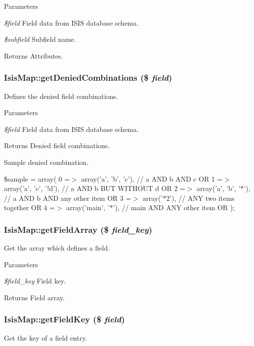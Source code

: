 \begin{DoxyParams}{Parameters}
\item[{\em \$field}]Field data from ISIS database schema.\item[{\em \$subfield}]Subfield name.\end{DoxyParams}
\begin{DoxyReturn}{Returns}
Attributes. 
\end{DoxyReturn}
\hypertarget{classIsisMap_a57808b2ac5892d71308c629b6ae990ff}{
\subsubsection[{getDeniedCombinations}]{\setlength{\rightskip}{0pt plus 5cm}IsisMap::getDeniedCombinations (\$ {\em field})}}
\label{classIsisMap_a57808b2ac5892d71308c629b6ae990ff}
Defines the denied field combinations.


\begin{DoxyParams}{Parameters}
\item[{\em \$field}]Field data from ISIS database schema.\end{DoxyParams}
\begin{DoxyReturn}{Returns}
Denied field combinations. 
\end{DoxyReturn}


Sample denied combination.

\$sample = array( 0 =$>$ array('a', 'b', 'c'), // a AND b AND c OR 1 =$>$ array('a', 'c', '!d'), // a AND b BUT WITHOUT d OR 2 =$>$ array('a', 'b', '$\ast$'), // a AND b AND any other item OR 3 =$>$ array('$\ast$2'), // ANY two items together OR 4 =$>$ array('main', '$\ast$'), // main AND ANY other item OR );

\hypertarget{classIsisMap_aee1953b6e46b1612c725b2da82414d14}{
\subsubsection[{getFieldArray}]{\setlength{\rightskip}{0pt plus 5cm}IsisMap::getFieldArray (\$ {\em field\_\-key})}}
\label{classIsisMap_aee1953b6e46b1612c725b2da82414d14}
Get the array which defines a field.


\begin{DoxyParams}{Parameters}
\item[{\em \$field\_\-key}]Field key.\end{DoxyParams}
\begin{DoxyReturn}{Returns}
Field array. 
\end{DoxyReturn}
\hypertarget{classIsisMap_ac6a4eed048ddfa62c76e6d813754af81}{
\subsubsection[{getFieldKey}]{\setlength{\rightskip}{0pt plus 5cm}IsisMap::getFieldKey (\$ {\em field})}}
\label{classIsisMap_ac6a4eed048ddfa62c76e6d813754af81}
Get the key of a field entry.


